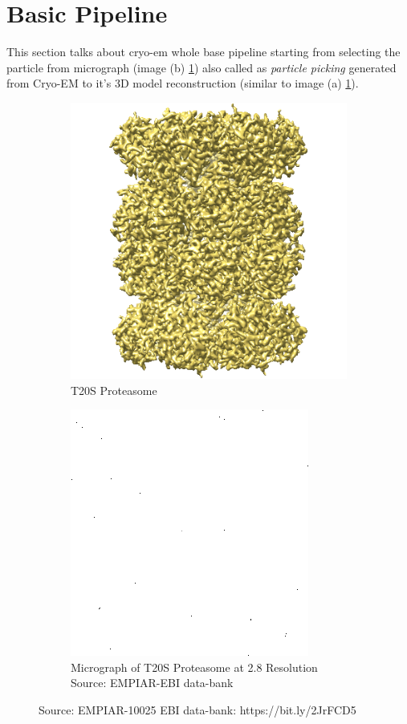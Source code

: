 \documentclass[twoside]{iitbreport}
\begin{document}
\section{Basic Pipeline}\label{sec: basic_pipeline}
This section talks about cryo-em whole base pipeline starting from selecting the particle from micrograph (image (b) \ref{fig:micrograph}) also called as \textit{particle picking} generated from Cryo-EM to it's 3D model reconstruction (similar to image (a) \ref{fig:micrograph}). 

\begin{figure}[h]
\centering
\begin{subfigure}{.5\textwidth}
\centering
\includegraphics[width=0.5\linewidth]{EMPIAR-10025}
\captionsetup{justification=centering}
\caption{T20S Proteasome}
\end{subfigure} %

\begin{subfigure}{.75\textwidth}
\centering
\includegraphics[width=0.75\linewidth]{micrograph}
\captionsetup{justification=centering}
\caption{ Micrograph of T20S Proteasome at 2.8 \text{\AA} Resolution Source: EMPIAR-EBI data-bank}
\end{subfigure}
\caption{ Source: EMPIAR-10025 EBI data-bank: https://bit.ly/2JrFCD5}
\label{fig:micrograph}
\end{figure}
\end{document}

